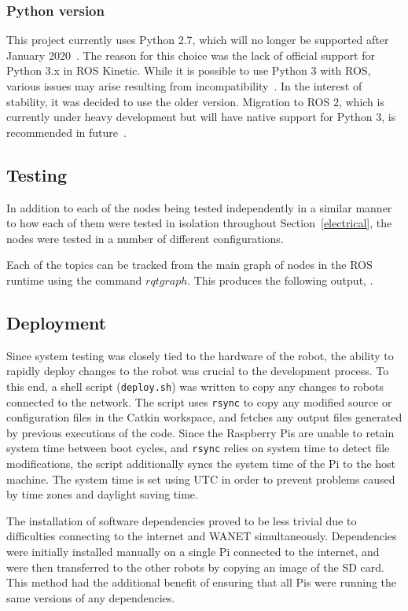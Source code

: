 \subsubsection{Python version}
This project currently uses Python 2.7, which will no longer be supported
after January 2020~\cite{python2-eol}. The reason for this choice was the
lack of official support for Python 3.x in ROS Kinetic. While it is
possible to use Python 3 with ROS, various issues may arise resulting from
incompatibility~\cite{medium-ros-python3}. In the interest of stability,
it was decided to use the older version. Migration to ROS 2, which is
currently under heavy development but will have native support for Python
3, is recommended in future~\cite{ros2}.

\subsection{Testing}\label{soft/ROS/test}
In addition to each of the nodes being tested independently in a similar
manner to how each of them were tested in isolation throughout
Section~\ref{electrical}, the nodes were tested in a number of different
configurations.

Each of the topics can be tracked from the main graph of nodes in the ROS
runtime using the command $rqt graph$. This produces the following output,
.


\subsection{Deployment}\label{soft/ROS/deploy}
Since system testing was closely tied to the hardware of the robot, the
ability to rapidly deploy changes to the robot was crucial to the
development process. To this end, a shell script (\verb|deploy.sh|) was
written to copy any changes to robots connected to the network. The script
uses \verb|rsync| to copy any modified source or configuration files in
the Catkin workspace, and fetches any output files generated by previous
executions of the code. Since the Raspberry Pis are unable to retain
system time between boot cycles, and \verb|rsync| relies on system time to
detect file modifications, the script additionally syncs the system time
of the Pi to the host machine. The system time is set using UTC in order
to prevent problems caused by time zones and daylight saving time.

The installation of software dependencies proved to be less trivial due to
difficulties connecting to the internet and WANET simultaneously.
Dependencies were initially installed manually on a single Pi connected to
the internet, and were then transferred to the other robots by copying an
image of the SD card. This method had the additional benefit of ensuring
that all Pis were running the same versions of any dependencies.

